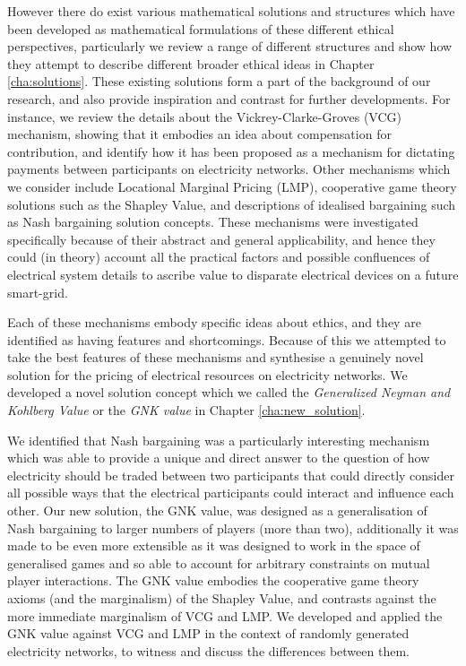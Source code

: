 However there do exist various mathematical solutions and structures which have been developed as mathematical formulations of these different ethical perspectives, particularly we review a range of different structures and show how they attempt to describe different broader ethical ideas in Chapter \ref{cha:solutions}.
These existing solutions form a part of the background of our research, and also provide inspiration and contrast for further developments.
For instance, we review the details about the Vickrey-Clarke-Groves (VCG) mechanism, showing that it embodies an idea about compensation for contribution, and identify how it has been proposed as a mechanism for dictating payments between participants on electricity networks.
Other mechanisms which we consider include Locational Marginal Pricing (LMP), cooperative game theory solutions such as the Shapley Value, and descriptions of idealised bargaining such as Nash bargaining solution concepts.
These mechanisms were investigated specifically because of their abstract and general applicability, and hence they could (in theory) account all the practical factors and possible confluences of electrical system details to ascribe value to disparate electrical devices on a future smart-grid.


Each of these mechanisms embody specific ideas about ethics, and they are identified as having features and shortcomings. Because of this we attempted to take the best features of these mechanisms and synthesise a genuinely novel solution for the pricing of electrical resources on electricity networks.
We developed a novel solution concept which we called the \textit{Generalized Neyman and Kohlberg Value} or the \textit{GNK value} in Chapter \ref{cha:new_solution}.

We identified that Nash bargaining was a particularly interesting mechanism which was able to provide a unique and direct answer to the question of how electricity should be traded between two participants that could directly consider all possible ways that the electrical participants could interact and influence each other.
Our new solution, the GNK value, was designed as a generalisation of Nash bargaining to larger numbers of players (more than two), additionally it was made to be even more extensible as it was designed to work in the space of generalised games and so able to account for arbitrary constraints on mutual player interactions.
The GNK value embodies the cooperative game theory axioms (and the marginalism) of the Shapley Value, and contrasts against the more immediate marginalism of VCG and LMP.
We developed and applied the GNK value against VCG and LMP in the context of randomly generated electricity networks, to witness and discuss the differences between them.

